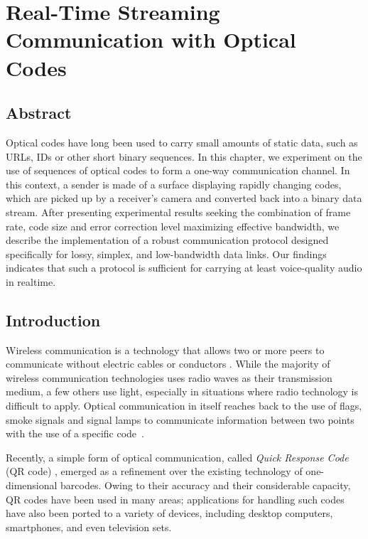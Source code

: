 \chapter{Real-Time Streaming Communication with Optical Codes}
\vspace*{\fill}{This chapter represents a modified version of a paper published in 2016 in IEEE Access, v.4, p. 284-298 by K. Xie and S. Gaboury and S. Hallé.\clearpage}

\section*{Abstract}
Optical codes have long been used to carry small amounts of static data, such as URLs, IDs or other short binary sequences. In this chapter, we experiment on the use of sequences of optical codes to form a one-way communication channel. In this context, a sender is made of a surface displaying rapidly changing codes, which are picked up by a receiver's camera and converted back into a binary data stream. After presenting experimental results seeking the combination of frame rate, code size and error correction level maximizing effective bandwidth, we describe the implementation of a robust communication protocol designed specifically for lossy, simplex, and low-bandwidth data links. Our findings indicates that such a protocol is sufficient for carrying at least voice-quality audio in realtime.

\section{Introduction}\label{sec:qr:intro} %

Wireless communication is a technology that allows two or more peers to communicate without electric cables or conductors \cite{tse2005fundamentals}. While the majority of wireless communication technologies uses radio waves as their transmission medium, a few others use light, especially in situations where radio technology is difficult to apply. Optical communication in itself reaches back to the use of flags, smoke signals and signal lamps to communicate information between two points with the use of a specific code~\cite{burns2004}.

Recently, a simple form of optical communication, called \emph{Quick Response Code} (QR code) \cite{qrcode-about}, emerged as a refinement over the existing technology of one-dimensional barcodes. Owing to their accuracy and their considerable capacity, QR codes have been used in many areas; applications for handling such codes have also been ported to a variety of devices, including desktop computers, smartphones, and even television sets.


